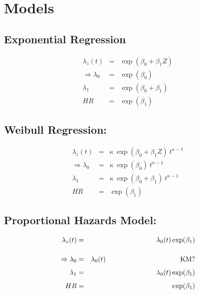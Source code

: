 \documentclass[11pt,psfig]{book}
\begin{document}
\section{Models}
\subsection{Exponential Regression}
\begin{eqnarray*}
\lambda_z(t) & = & \exp(\beta_0 + \beta_1 Z)\\[3ex]
\Rightarrow \lambda_0 & = & \exp(\beta_0)\\[1ex]
            \lambda_1 & = & \exp(\beta_0+\beta_1)\\[1ex]
                   HR & = & \exp(\beta_1)
\end{eqnarray*}
\subsection{Weibull Regression:}
\begin{eqnarray*}
\lambda_z(t) & = & \kappa ~\exp(\beta_0 + \beta_1 Z) ~t^{\kappa-1}\\[3ex]
\Rightarrow \lambda_0 & = & \kappa ~\exp(\beta_0) ~t^{\kappa-1}\\[1ex]
            \lambda_1 & = & \kappa ~\exp(\beta_0+\beta_1) ~t^{\kappa-1}\\[1ex]
                   HR & = & \exp(\beta_1)
\end{eqnarray*}

\subsection{Proportional Hazards Model:}
\begin{eqnarray*}
\lambda_z(t) & = & \lambda_0(t) \exp(\beta_1)\\[3ex]
\Rightarrow \lambda_0 & = & \lambda_0(t) \hspace{1.5in} \mbox{KM?}\\[1ex]
            \lambda_1 & = & \lambda_0(t) \exp(\beta_1)\\[1ex]
                   HR & = & \exp(\beta_1)
\end{eqnarray*}
\end{document}
